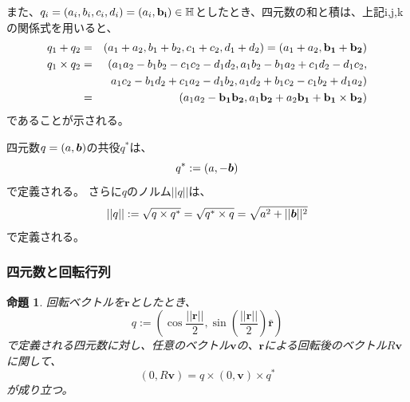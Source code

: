 \documentclass[10pt]{jarticle}
\newtheorem{Prp}{命題}[section]
\begin{document}
また、$q_i = (a_i,b_i,c_i,d_i) = (a_i,\bf{b_i}) \in \mathbb{H}$としたとき、四元数の和と積は、上記i,j,kの関係式を用いると、
\begin{eqnarray}
q_1 + q_2 &=& (a_1+a_2,b_1+b_2,c_1+c_2,d_1+d_2) = (a_1+a_2,\bf b_1+\bf b_2)\\
q_1 \times q_2 &=& (a_1 a_2 - b_1 b_2 - c_1 c_2 - d_1 d_2, a_1 b_2 - b_1 a_2 + c_1 d_2 - d_1 c_2,\nonumber \\
	&& a_1 c_2 - b_1 d_2 + c_1 a_2 - d_1 b_2, a_1 d_2 + b_1 c_2 - c_1 b_2 + d_1 a_2 ) \\
	&=& (a_1a_2 - \bold{b_1 b_2}, a_1 \bold{b_2} + a_2 \bold{b_1} + \bold{b_1 \times b_2})
\end{eqnarray}
であることが示される。

四元数$q = (a,\textrm{\boldmath $b$})$の共役$q^*$は、
\begin{equation}
q^* := (a, -\textrm{\boldmath $b$})
\end{equation}
で定義される。
さらに$q$のノルム$||q||$は、
\begin{equation}
||q|| := \sqrt{q \times q^*} = \sqrt{q^* \times q} = \sqrt{a^2 + ||\textrm{\boldmath $b$}||^2}
\end{equation}
で定義される。

\subsubsection{四元数と回転行列}
\begin{Prp}
    回転ベクトルを$\boldsymbol{r}$としたとき、
    \begin{equation}
        q := (\cos \frac{||\boldsymbol{r}||}{2}, \sin (\frac{||\boldsymbol{r}||}{2}) \boldsymbol{\bar{r}})
    \end{equation}
    で定義される四元数に対し、任意のベクトル$\boldsymbol{v}$の、$\boldsymbol{r}$による回転後のベクトル$R \boldsymbol{v}$に関して、
    \begin{equation}
        (0, R\boldsymbol{v}) = q \times (0, \boldsymbol{v}) \times q^* \label{rotquat}
    \end{equation}
    が成り立つ。
\end{Prp}
\end{document}
